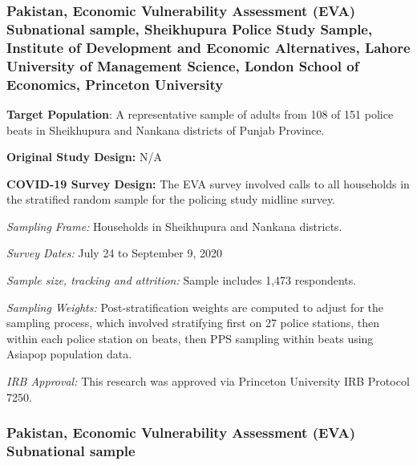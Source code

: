 \documentclass[
  12pt,
]{article}
\begin{document}
\hypertarget{pakistan-economic-vulnerability-assessment-eva-subnational-sample-sheikhupura-police-study-sample-institute-of-development-and-economic-alternatives-lahore-university-of-management-science-london-school-of-economics-princeton-university}{%
\subsubsection*{Pakistan, Economic Vulnerability Assessment (EVA) Subnational sample, Sheikhupura Police Study Sample, Institute of Development and Economic Alternatives, Lahore University of Management Science, London School of Economics, Princeton University}\label{pakistan-economic-vulnerability-assessment-eva-subnational-sample-sheikhupura-police-study-sample-institute-of-development-and-economic-alternatives-lahore-university-of-management-science-london-school-of-economics-princeton-university}}

\textbf{Target Population}: A representative sample of adults from 108 of 151 police beats in Sheikhupura and Nankana districts of Punjab Province.

\textbf{Original Study Design:} N/A

\textbf{COVID-19 Survey Design:} The EVA survey involved calls to all households in the stratified random sample for the policing study midline survey.

\emph{Sampling Frame:} Households in Sheikhupura and Nankana districts.

\emph{Survey Dates:} July 24 to September 9, 2020

\emph{Sample size, tracking and attrition:} Sample includes 1,473 respondents.

\emph{Sampling Weights:} Post-stratification weights are computed to adjust for the sampling process, which involved stratifying first on 27 police stations, then within each police station on beats, then PPS sampling within beats using Asiapop population data.

\emph{IRB Approval:} This research was approved via Princeton University IRB Protocol 7250.

\hypertarget{pakistan-economic-vulnerability-assessment-eva-subnational-sample}{%
\subsubsection*{Pakistan, Economic Vulnerability Assessment (EVA) Subnational sample}\label{pakistan-economic-vulnerability-assessment-eva-subnational-sample}}
\end{document}
